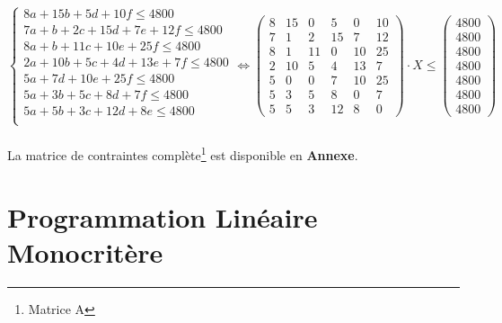 \documentclass[a4paper, 11pt]{article}
\begin{document}
$$
\left\{\begin{split}
	8a+15b+5d+10f \leq 4800 \\
    7a+b+2c+15d+7e+12f \leq 4800 \\
    8a+b+11c+10e+25f \leq 4800 \\
    2a+10b+5c+4d+13e+7f \leq 4800 \\
    5a+7d+10e+25f \leq 4800 \\
	5a+3b+5c+8d+7f \leq 4800\\
	5a+5b+3c+12d+8e \leq 4800\\
\end{split}\right. \Leftrightarrow \begin{pmatrix}
        8&15&0&5&0&10 \\
        7&1&2&15&7&12\\
        8&1&11&0&10&25\\
        2&10&5&4&13&7\\
        5&0&0&7&10&25\\
        5&3&5&8&0&7\\
        5&5&3&12&8&0
    \end{pmatrix} \cdot X \leq \begin{pmatrix}
        4800\\
        4800\\
        4800\\
        4800\\
        4800\\
        4800\\
        4800
    \end{pmatrix}
$$ \\
La matrice de contraintes complète\footnote{Matrice A} est disponible en \textbf{Annexe}.
\section{Programmation Linéaire Monocritère}
\end{document}
